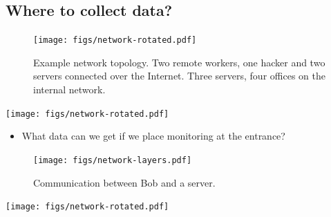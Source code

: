 \subsection{Where to collect data?}

\begin{frame}
  \begin{figure}
    \texttt{[image: figs/network-rotated.pdf]}
    \caption{Example network topology.
      Two remote workers, one hacker and two servers connected over the 
      Internet.
      Three servers, four offices on the internal network.
    }
  \end{figure}
\end{frame}

\begin{frame}
  \centering
  \texttt{[image: figs/network-rotated.pdf]}
  \begin{question}
    \begin{itemize}
      \item What data can we get if we place monitoring at the entrance?
    \end{itemize}
  \end{question}
\end{frame}

\begin{frame}
  \begin{figure}
    \texttt{[image: figs/network-layers.pdf]}
    \caption{Communication between Bob and a server.}
  \end{figure}
\end{frame}

\begin{frame}
  \centering
  \texttt{[image: figs/network-rotated.pdf]}

\end{frame}


